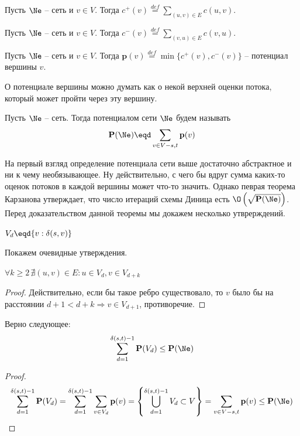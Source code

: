 \newcommand{\p}{\mathbf{p}}

\renewcommand{\P}{\mathbf{P}}

\Def Пусть $\Ne$ -- сеть и $v \in V$. Тогда $c^+(v) \overset{def}{=} \sum\limits_{(u, v) \in E} c(u, v)$.

\Def Пусть $\Ne$ -- сеть и $v \in V$. Тогда $c^-(v) \overset{def}{=} \sum\limits_{(v, u) \in E} c(v, u)$.

\Def Пусть $\Ne$ -- сеть и $v \in V$. Тогда $\p(v) \overset{def}{=} \min\{c^+(v), c^-(v)\}$ -- потенциал вершины $v$.

О потенциале вершины можно думать как о некой верхней оценки потока, который может пройти через эту вершину.

\Def Пусть $\Ne$ -- сеть. Тогда потенциалом сети $\Ne$ будем называть
\begin{equation*}
    \P(\Ne) \eqd \sum\limits_{v \in V - s, t} \p(v)
\end{equation*}

На первый взгляд определение потенциала сети выше достаточно абстрактное и ни к чему необязывающее.
Ну действительно, с чего бы вдруг сумма каких-то оценок потоков в каждой вершины может что-то значить.
Однако певрая теорема Карзанова утверждает, что число итераций схемы Диница есть $\O\left(\sqrt {\P(\Ne)}\right)$. Перед доказательством данной теоремы мы докажем несколько утврерждений.

\Def $V_d \eqd \{ v: \delta(s, v) \}$

Покажем очевидные утверждения.

\St $\forall k \geq 2 \, \nexists (u, v) \in E: u \in V_d, v \in V_{d+k}$
\begin{proof}
    
    Действительно, если бы такое ребро существовало, то $v$ было бы на расстоянии $d + 1 < d + k \Rightarrow v \in V_{d + 1}$, противоречие.

\end{proof}

\St Верно следующее:
\begin{equation*}
    \sum\limits_{d = 1}^{\delta(s, t) - 1} \P(V_d) \leq \P(\Ne) 
\end{equation*}
\begin{proof}
    \begin{equation*}
        \sum\limits_{d = 1}^{\delta(s, t) - 1} \P(V_d) = \sum\limits_{d = 1}^{\delta(s, t) - 1} \sum\limits_{v \in V_d} \p(v) = \left\{ \bigcup_{d = 1}^{\delta(s, t) - 1} V_d \subset V \right\} = \sum\limits_{v \in V - s, t} \p(v) \leq \P(\Ne)
    \end{equation*}
\end{proof}

